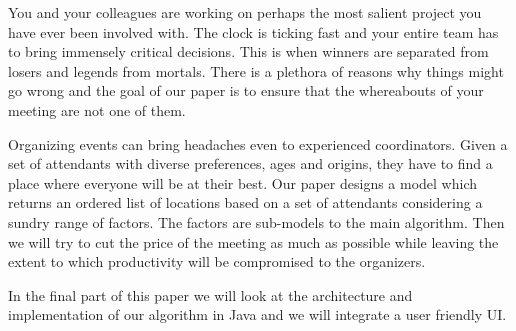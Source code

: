 You and your colleagues are working on perhaps the most salient project you have ever been involved with. The clock is ticking fast and your entire team has to bring immensely critical decisions. This is when winners are separated from losers and legends from mortals. There is a plethora of reasons why things might go wrong and the goal of our paper is to ensure that the whereabouts of your meeting are not one of them. 

Organizing events can bring headaches even to experienced coordinators. Given a set of attendants with diverse preferences, ages and origins, they have to find a place where everyone will be at their best. Our paper designs a model which returns an ordered list of locations based on a set of attendants considering a sundry range of factors. The factors are sub-models to the main algorithm. Then we will try to cut the price of the meeting as much as possible while leaving the extent to which productivity will be compromised to the organizers.

In the final part of this paper we will look at the architecture and implementation of our algorithm in Java and we will integrate a user friendly UI.













